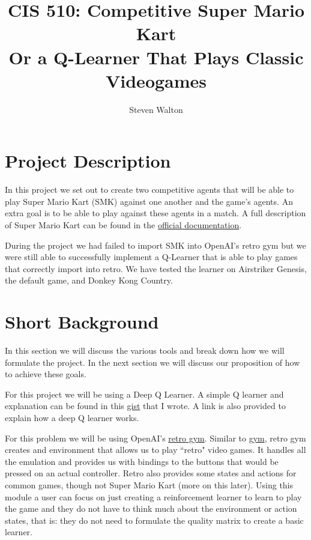 \documentclass[12pt,letter]{article}
\begin{document}
\title{CIS 510: Competitive Super Mario Kart\\
\large Or a Q-Learner That Plays Classic Videogames}
\author{Steven Walton}
\maketitle

\section{Project Description}
In this project we set out to create two competitive agents that will be able to
play Super Mario Kart (SMK) against one another and the game's agents. An 
extra goal is to be able to play against these agents in a match. A full 
description of Super Mario Kart can be found in the 
\href{https://www.nintendo.co.jp/clvs/manuals/common/pdf/CLV-P-SAAFE.pdf}
{official documentation}.

During the project we had failed to import SMK into OpenAI's retro gym but we
were still able to successfully implement a Q-Learner that is able to play 
games that correctly import into retro. We have tested the learner on
Airstriker Genesis, the default game, and Donkey Kong Country. 

\section{Short Background}
In this section we will discuss the various tools and break down how we will
formulate the project. In the next section we will discuss our proposition of
how to achieve these goals.

For this project we will be using a Deep Q Learner. A simple Q learner and
explanation can be found in this 
\href{https://gist.github.com/stevenwalton/4e4b664d494b35be2d6882c7e50eb893}
{gist} that I wrote. A link is also provided to explain how a deep Q learner
works. 

For this problem we will be using OpenAI's \href{https://github.com/openai/retro/}
{retro gym}. Similar to \href{https://github.com/openai/gym}{gym}, retro gym 
creates and environment that allows us to play ``retro" video games. It handles
all the emulation and provides us with bindings to the buttons that would be
pressed on an actual controller. Retro also provides some states and actions for
common games, though not Super Mario Kart (more on this later). Using this
module a user can focus on just creating a reinforcement learner to learn to 
play the game and they do not have to think much about the environment or action
states, that is: they do not need to formulate the quality matrix to create a
basic learner. 
\end{document}
